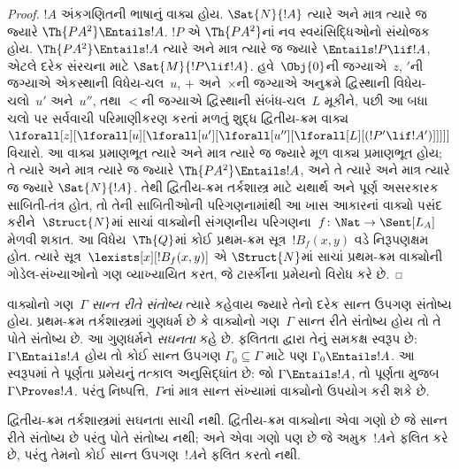 \begin{proof}
$!A$ અંકગણિતની ભાષાનું વાક્ય હોય. $\Sat{N}{!A}$ ત્યારે
અને માત્ર ત્યારે જ જ્યારે $\Th{PA^2} \Entails !A$. $!P$ એ
$\Th{PA^2}$નાં નવ સ્વયંસિદ્ધિઓનો સંયોજક હોય. $\Th{PA^2} \Entails !A$
ત્યારે અને માત્ર ત્યારે જ જ્યારે $\Entails !P \lif
!A$, એટલે દરેક સંરચના માટે
$\Sat{M}{!P \lif !A}$. 
હવે~$\Obj{0}$ની જગ્યાએ~$z$, $\prime$ની જગ્યાએ એકસ્થાની
વિધેય-ચલ~$u$, $+$ અને~$\times$ની જગ્યાએ અનુક્રમે દ્વિસ્થાની
વિધેય-ચલો~$u'$ અને~$u''$, તથા $<$ની જગ્યાએ દ્વિસ્થાની સંબંધ-ચલ~$L$
મૂકીને, પછી આ બધા ચલો પર સર્વવાચી પરિમાણીકરણ કરતાં મળતું શુદ્ધ
દ્વિતીય-ક્રમ વાક્ય
$\lforall[z][\lforall[u][\lforall[u'][\lforall[u''][\lforall[L][(!P' \lif !A')]]]]]$
વિચારો. આ વાક્ય પ્રમાણભૂત ત્યારે અને માત્ર ત્યારે જ જ્યારે મૂળ વાક્ય
પ્રમાણભૂત હોય; તે ત્યારે અને માત્ર ત્યારે જ જ્યારે
$\Th{PA^2} \Entails !A$, અને તે ત્યારે અને માત્ર ત્યારે જ જ્યારે
$\Sat{N}{!A}$. તેથી દ્વિતીય-ક્રમ તર્કશાસ્ત્ર માટે યથાર્થ અને પૂર્ણ
અસરકારક સાબિતી-તંત્ર હોત, તો તેની સાબિતીઓની પરિગણનામાંથી આ ખાસ
આકારનાં વાક્યો પસંદ કરીને~$\Struct{N}$માં સાચાં વાક્યોની
સંગણનીય પરિગણના~$f\colon \Nat \to \Sent[L_A]$ મેળવી શકાત. આ
વિધેય~$\Th{Q}$માં કોઈ પ્રથમ-ક્રમ સૂત્ર~$!B_f(x, y)$ વડે નિરૂપણક્ષમ
હોત. ત્યારે સૂત્ર~$\lexists[x][!B_f(x, y)]$ એ
$\Struct{N}$માં સાચાં પ્રથમ-ક્રમ વાક્યોની ગોડેલ-સંખ્યાઓનો
ગણ વ્યાખ્યાયિત કરત, જે ટાર્સ્કીના પ્રમેયનો વિરોધ કરે છે.
\end{proof}
\endgroup


\begingroup
\makeatletter{}\makeatother


\label{guunit:OLP-0334}


\begin{explain}
વાક્યોનો ગણ~$\Gamma$ \emph{સાન્ત રીતે સંતોષ્ય} ત્યારે કહેવાય જ્યારે
તેનો દરેક સાન્ત ઉપગણ સંતોષ્ય હોય. પ્રથમ-ક્રમ તર્કશાસ્ત્રમાં ગુણધર્મ છે
કે વાક્યોનો ગણ~$\Gamma$ સાન્ત રીતે સંતોષ્ય હોય તો તે પોતે
સંતોષ્ય છે. આ ગુણધર્મને \emph{સઘનતા} કહે છે. ફલિતતા દ્વારા તેનું
સમકક્ષ સ્વરૂપ છે: $\Gamma \Entails !A$ હોય તો કોઈ સાન્ત ઉપગણ
$\Gamma_0 \subseteq \Gamma$ માટે પણ $\Gamma_0 \Entails
!A$. આ સ્વરૂપમાં તે પૂર્ણતા પ્રમેયનું તત્કાલ અનુસિદ્ધાંત છે: જો
$\Gamma \Entails !A$, તો પૂર્ણતા મુજબ $\Gamma \Proves !A$. પરંતુ
નિષ્પત્તિ,~$\Gamma$નાં માત્ર સાન્ત સંખ્યામાં વાક્યોનો
ઉપયોગ કરી શકે છે.

દ્વિતીય-ક્રમ તર્કશાસ્ત્રમાં સઘનતા સાચી નથી. દ્વિતીય-ક્રમ
વાક્યોના એવા ગણો છે જે સાન્ત રીતે સંતોષ્ય છે પરંતુ પોતે
સંતોષ્ય નથી; અને એવા ગણો પણ છે જે અમુક~$!A$ને ફલિત કરે છે,
પરંતુ તેમનો કોઈ સાન્ત ઉપગણ~$!A$ને ફલિત કરતો નથી.
\end{explain}



